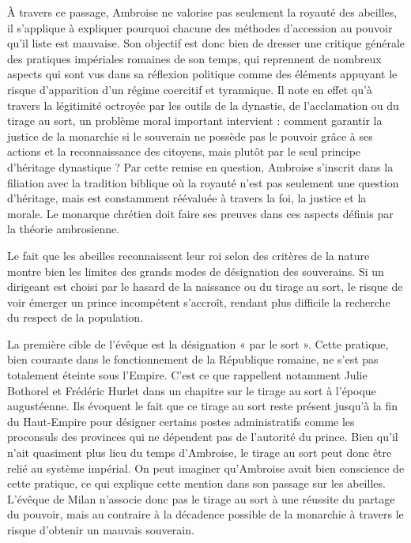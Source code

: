 \bigskip

À travers ce passage, Ambroise ne valorise pas seulement la royauté des abeilles, il s'applique à expliquer pourquoi chacune des méthodes d'accession au pouvoir qu'il liste est mauvaise. Son objectif est donc bien de dresser une critique générale des pratiques impériales romaines de son temps, qui reprennent de nombreux aspects qui sont vus dans sa réflexion politique comme des éléments appuyant le risque d'apparition d'un régime coercitif et tyrannique. Il note en effet qu'à travers la légitimité octroyée par les outils de la dynastie, de l'acclamation ou du tirage au sort, un problème moral important intervient : comment garantir la justice de la monarchie si le souverain ne possède pas le pouvoir grâce à ses actions et la reconnaissance des citoyens, mais plutôt par le seul principe d'héritage dynastique ? Par cette remise en question, Ambroise s'inscrit dans la filiation avec la tradition biblique où la royauté n'est pas seulement une question d'héritage, mais est constamment réévaluée à travers la foi, la justice et la morale. Le monarque chrétien doit faire ses preuves dans ces aspects définis par la théorie ambrosienne.

\bigskip

Le fait que les abeilles reconnaissent leur roi selon des critères de la nature montre bien les limites des grands modes de désignation des souverains. Si un dirigeant est choisi par le hasard de la naissance ou du tirage au sort, le risque de voir émerger un prince incompétent s'accroît, rendant plus difficile la recherche du respect de la population.

\bigskip

La première cible de l'évêque est la désignation « par le sort ». Cette pratique, bien courante dans le fonctionnement de la République romaine, ne s'est pas totalement éteinte sous l'Empire. C'est ce que rappellent notamment Julie Bothorel et Frédéric Hurlet dans un chapitre sur le tirage au sort à l'époque augustéenne. Ils évoquent le fait que ce tirage au sort reste présent jusqu'à la fin du Haut-Empire pour désigner certains postes administratifs comme les proconsuls des provinces qui ne dépendent pas de l'autorité du prince\autocite{bothorel_tirageausort}. Bien qu'il n'ait quasiment plus lieu du temps d'Ambroise, le tirage au sort peut donc être relié au système impérial. On peut imaginer qu'Ambroise avait bien conscience de cette pratique, ce qui explique cette mention dans son passage sur les abeilles. L'évêque de Milan n'associe donc pas le tirage au sort à une réussite du partage du pouvoir, mais au contraire à la décadence possible de la monarchie à travers le risque d'obtenir un mauvais souverain.

